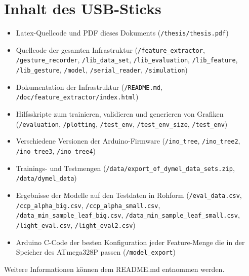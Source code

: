 \chapter{Inhalt des USB-Sticks}
\begin{itemize}
    \item Latex-Quellcode und PDF dieses Dokuments (\texttt{/thesis/thesis.pdf})
    \item Quellcode der gesamten Infrastruktur (\texttt{/feature\_extractor}, \texttt{/gesture\_recorder}, \texttt{/lib\_data\_set}, \texttt{/lib\_evaluation}, \texttt{/lib\_feature}, \texttt{/lib\_gesture}, \texttt{/model}, \texttt{/serial\_reader}, \texttt{/simulation})
    \item Dokumentation der Infrastruktur (\texttt{/README.md}, \\\texttt{/doc/feature\_extractor/index.html})
    \item Hilfsskripte zum trainieren, validieren und generieren von Grafiken (\texttt{/evaluation}, \texttt{/plotting}, \texttt{/test\_env}, \texttt{/test\_env\_size}, \texttt{/test\_env})
    \item Verschiedene Versionen der Arduino-Firmware (\texttt{/ino\_tree}, \texttt{/ino\_tree2}, \\\texttt{/ino\_tree3}, \texttt{/ino\_tree4})
    \item Trainings- und Testmengen (\texttt{/data/export\_of\_dymel\_data\_sets.zip}, \\\texttt{/data/dymel\_data})
    \item Ergebnisse der Modelle auf den Testdaten in Rohform (\texttt{/eval\_data.csv}, \\\texttt{/ccp\_alpha\_big.csv}, \texttt{/ccp\_alpha\_small.csv}, \\\texttt{/data\_min\_sample\_leaf\_big.csv}, \texttt{/data\_min\_sample\_leaf\_small.csv}, \texttt{/light\_eval.csv}, \texttt{/light\_eval2.csv})
    \item Arduino C-Code der besten Konfiguration jeder Feature-Menge die in der Speicher des ATmega328P passen (\texttt{/model\_export})
\end{itemize}
Weitere Informationen können dem README.md entnommen werden.